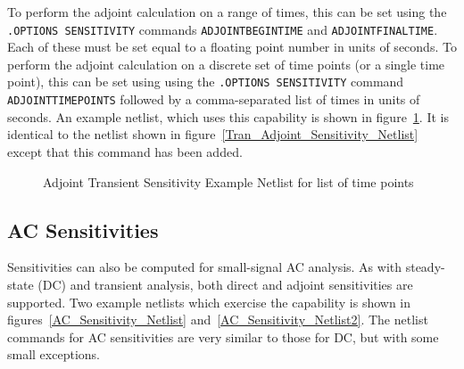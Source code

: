 To perform the adjoint calculation on a range of times, this can be set using 
the \texttt{.OPTIONS SENSITIVITY} commands \texttt{ADJOINTBEGINTIME} and 
\texttt{ADJOINTFINALTIME}.  Each of these must be set equal to a floating point
number in units of seconds.  To perform the adjoint calculation on a discrete 
set of time points (or a single time point), this can be set using using the 
\texttt{.OPTIONS SENSITIVITY} command \texttt{ADJOINTTIMEPOINTS} followed by a 
comma-separated list of times in units of seconds.  An example netlist, which 
uses this capability is shown in figure~\ref{Tran_Adjoint_Sensitivity_Netlist2}.  
It is identical to the netlist shown in figure~\ref{Tran_Adjoint_Sensitivity_Netlist} 
except that this command has been added.
\begin{figure}[htbp]
  \begin{centering}
\caption[Adjoint Transient Sensitivity Example Netlist for list of time points]
{Adjoint Transient Sensitivity Example Netlist for list of time points\label{Tran_Adjoint_Sensitivity_Netlist2} }
\end{centering}
\end{figure}

\clearpage
\subsection{AC Sensitivities}
Sensitivities can also be computed for small-signal AC analysis.  As
with steady-state (DC) and transient analysis, both direct and adjoint
sensitivities are supported.  Two example netlists which exercise the
capability is shown in figures~\ref{AC_Sensitivity_Netlist} 
and~\ref{AC_Sensitivity_Netlist2}.
The netlist commands for AC sensitivities are very similar to those
for DC, but with some small exceptions.   

